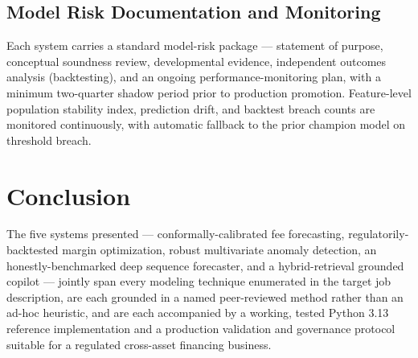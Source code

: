 \documentclass[11pt]{report}
\begin{document}
\section{Model Risk Documentation and Monitoring}
Each system carries a standard model-risk package — statement of purpose, conceptual soundness review,
developmental evidence, independent outcomes analysis (backtesting), and an ongoing
performance-monitoring plan, with a minimum two-quarter shadow period prior to production promotion.
Feature-level population stability index, prediction drift, and backtest breach counts are monitored
continuously, with automatic fallback to the prior champion model on threshold breach.

\chapter{Conclusion}
The five systems presented — conformally-calibrated fee forecasting, regulatorily-backtested margin
optimization, robust multivariate anomaly detection, an honestly-benchmarked deep sequence forecaster,
and a hybrid-retrieval grounded copilot — jointly span every modeling technique enumerated in the
target job description, are each grounded in a named peer-reviewed method rather than an ad-hoc
heuristic, and are each accompanied by a working, tested Python 3.13 reference implementation and a
production validation and governance protocol suitable for a regulated cross-asset financing business.
\end{document}
